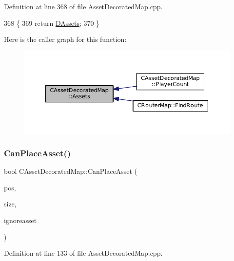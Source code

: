 Definition at line 368 of file Asset\+Decorated\+Map.\+cpp.


\begin{DoxyCode}
368                                                                                 \{
369     \textcolor{keywordflow}{return} \hyperlink{classCAssetDecoratedMap_a94eeed5b16141169b1ba6cb3842055aa}{DAssets};
370 \}
\end{DoxyCode}
Here is the caller graph for this function\+:
\nopagebreak
\begin{figure}[H]
\begin{center}
\leavevmode
\includegraphics[width=350pt]{classCAssetDecoratedMap_a2f4d2597697593197567877900d55c52_icgraph}
\end{center}
\end{figure}
\hypertarget{classCAssetDecoratedMap_ad4baef4b84b066847459e45205c8575c}{}\label{classCAssetDecoratedMap_ad4baef4b84b066847459e45205c8575c} 
\subsubsection{\texorpdfstring{Can\+Place\+Asset()}{CanPlaceAsset()}}
{\footnotesize\ttfamily bool C\+Asset\+Decorated\+Map\+::\+Can\+Place\+Asset (\begin{DoxyParamCaption}\item[{const \hyperlink{classCPosition}{C\+Position} \&}]{pos,  }\item[{int}]{size,  }\item[{std\+::shared\+\_\+ptr$<$ \hyperlink{classCPlayerAsset}{C\+Player\+Asset} $>$}]{ignoreasset }\end{DoxyParamCaption})}



Definition at line 133 of file Asset\+Decorated\+Map.\+cpp.


